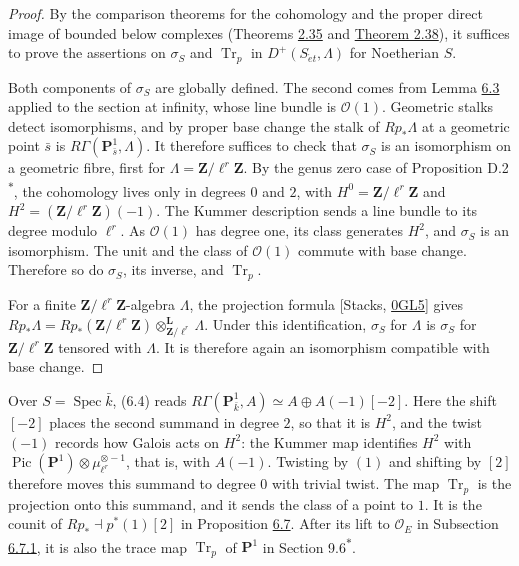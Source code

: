 \documentclass[11pt]{article}
\newcommand{\bpout}[1]{#1\textsuperscript{\hyperlink{bp-outside}{\ensuremath{\ast}}}}
\begin{document}
\begin{proof}[{Proof}]\label{bp527}%
By the comparison theorems for the cohomology and the proper direct image of bounded below complexes (Theorems \hyperref[bp103]{2.35} and \hyperref[bp113]{Theorem 2.38}), it suffices to prove the assertions on \(\sigma_S\) and \(\operatorname{Tr}_p\) in \(D^+(S_{\acute{e}t},\Lambda)\) for Noetherian \(S\).

Both components of \(\sigma_S\) are globally defined. The second comes from Lemma \hyperref[bp523]{6.3} applied to the section at infinity, whose line bundle is \(\mathcal O(1)\). Geometric stalks detect isomorphisms, and by proper base change the stalk of \(Rp_*\Lambda\) at a geometric point \(\bar s\) is \(R\Gamma(\mathbf P^1_{\bar s},\Lambda)\). It therefore suffices to check that \(\sigma_S\) is an isomorphism on a geometric fibre, first for \(\Lambda=\mathbf Z/\ell^r\mathbf Z\). By the genus zero case of Proposition \bpout{D.2}, the cohomology lives only in degrees \(0\) and \(2\), with \(H^0=\mathbf Z/\ell^r\mathbf Z\) and \(H^2=(\mathbf Z/\ell^r\mathbf Z)(-1)\). The Kummer description sends a line bundle to its degree modulo \(\ell^r\). As \(\mathcal O(1)\) has degree one, its class generates \(H^2\), and \(\sigma_S\) is an isomorphism. The unit and the class of \(\mathcal O(1)\) commute with base change. Therefore so do \(\sigma_S\), its inverse, and \(\operatorname{Tr}_p\).

For a finite \(\mathbf Z/\ell^r\mathbf Z\)-algebra \(\Lambda\), the projection formula [Stacks, \href{https://stacks.math.columbia.edu/tag/0GL5}{0GL5}] gives \(Rp_*\Lambda=Rp_*(\mathbf Z/\ell^r\mathbf Z)
\otimes^{\mathbf L}_{\mathbf Z/\ell^r}\Lambda\). Under this identification, \(\sigma_S\) for \(\Lambda\) is \(\sigma_S\) for \(\mathbf Z/\ell^r\mathbf Z\) tensored with \(\Lambda\). It is therefore again an isomorphism compatible with base change.
\end{proof}

\label{bp528}%
Over \(S=\operatorname{Spec}\bar k\), (6.4) reads \(R\Gamma(\mathbf P^1_{\bar k},A)\simeq A\oplus A(-1)[-2]\). Here the shift \([-2]\) places the second summand in degree \(2\), so that it is \(H^2\), and the twist \((-1)\) records how Galois acts on \(H^2\): the Kummer map identifies \(H^2\) with \(\operatorname{Pic}(\mathbf P^1)\otimes\mu_{\ell^r}^{\otimes-1}\), that is, with \(A(-1)\). Twisting by \((1)\) and shifting by \([2]\) therefore moves this summand to degree \(0\) with trivial twist. The map \(\operatorname{Tr}_p\) is the projection onto this summand, and it sends the class of a point to \(1\). It is the counit of \(Rp_*\dashv p^*(1)[2]\) in Proposition \hyperref[bp534]{6.7}. After its lift to \(\mathcal O_E\) in Subsection \hyperref[bp579]{6.7.1}, it is also the trace map \(\operatorname{Tr}_p\) of \(\mathbf P^1\) in Section \bpout{9.6}.
\end{document}
